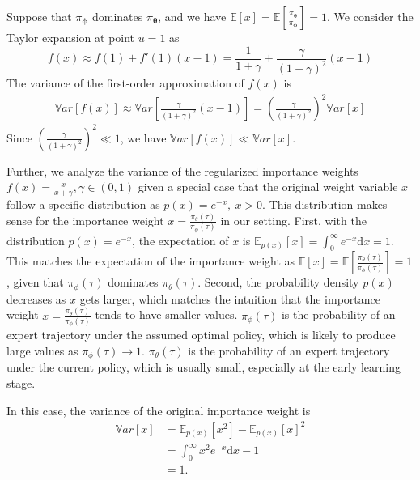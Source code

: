 Suppose that $\pi_{\bm{\phi}}$ dominates $\pi_{\bm{\theta}}$, and we have $\mathbb{E}[x]=\mathbb{E}[\frac{\pi_{\bm{\theta}}}{\pi_{\bm{\phi}}}]=1$.
We consider the Taylor expansion at point $u=1$ as
\begin{equation}
    f(x) \approx f(1) + f'(1)(x-1) = \frac{1}{1+\gamma} + \frac{\gamma}{(1+\gamma)^2}(x-1)
\end{equation}
The variance of the first-order approximation of $f(x)$ is 
\begin{equation}
\begin{aligned}
    \mathbb{V}ar[f(x)] \approx \mathbb{V}ar\left[\frac{\gamma}{(1+\gamma)^2}(x-1)\right] 
    = \left(\frac{\gamma}{(1+\gamma)^2}\right)^2  \mathbb{V}ar[x] 
\end{aligned}
\end{equation}
Since $ \left(\frac{\gamma}{(1+\gamma)^2}\right)^2\ll 1$, we have $\mathbb{V}ar[f(x)]\ll \mathbb{V}ar[x]$.



Further, we analyze the variance of the regularized importance weights $f(x)=\frac{x}{x+\gamma}, \gamma\in(0,1)$ given a special case that the original weight variable $x$ follow a specific distribution as $p(x)=e^{-x},~x>0$. 
This distribution makes sense for the importance weight $x=\frac{\pi_\theta(\tau)}{\pi_\phi(\tau)}$ in our setting.
First, with the distribution  $p(x)=e^{-x}$, the expectation of $x$ is $\mathbb{E}_{p(x)}[x]=\int_0^\infty e^{-x}\mathrm{d}x=1$.
This matches the expectation of the importance weight as $\mathbb{E}[x]=\mathbb{E}\left[\frac{\pi_\theta(\tau)}{\pi_\phi(\tau)}\right]=1$, given that $\pi_\phi(\tau)$ dominates $\pi_\theta(\tau)$.
Second, the probability density $p(x)$ decreases as $x$ gets larger, which matches the intuition that the importance weight $x=\frac{\pi_\theta(\tau)}{\pi_\phi(\tau)}$ tends to have smaller values.
$\pi_\phi(\tau)$ is the probability of an expert trajectory under the assumed optimal policy, which is likely to produce large values as $\pi_\phi(\tau)\to 1$.
$\pi_\theta(\tau)$ is the probability of an expert trajectory under the current policy, which is usually small, especially at the early learning stage.

In this case, the variance of the original importance weight is 
\begin{equation}
\begin{aligned}
	\mathbb{V}ar[x] & = \mathbb{E}_{p(x)}[x^2]  -  \mathbb{E}_{p(x)}[x]^2 \\
	& = \int_0^\infty x^2e^{-x}\mathrm{d}x - 1 \\
	& = 1.
\end{aligned}	
\end{equation}

